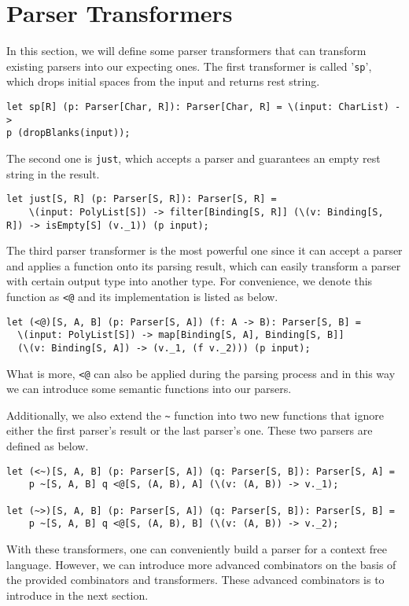 \section{Parser Transformers}
In this section, we will define some parser transformers that can transform existing parsers into our expecting ones. The first transformer is called '\texttt{sp}', which drops initial spaces from the input and returns rest string.
\begin{lstlisting}
let sp[R] (p: Parser[Char, R]): Parser[Char, R] = \(input: CharList) -> 
p (dropBlanks(input));
\end{lstlisting}
The second one is \texttt{just}, which accepts a parser and guarantees an empty rest string in the result.
\begin{lstlisting}
let just[S, R] (p: Parser[S, R]): Parser[S, R] =
    \(input: PolyList[S]) -> filter[Binding[S, R]] (\(v: Binding[S, R]) -> isEmpty[S] (v._1)) (p input);
\end{lstlisting}
The third parser transformer is the most powerful one since it can accept a parser and applies a function onto its parsing result, which can easily transform a parser with certain output type into another type. For convenience, we denote this function as \texttt{<@} and its implementation is listed as below.
\begin{lstlisting}
let (<@)[S, A, B] (p: Parser[S, A]) (f: A -> B): Parser[S, B] =
  \(input: PolyList[S]) -> map[Binding[S, A], Binding[S, B]] 
  (\(v: Binding[S, A]) -> (v._1, (f v._2))) (p input);
\end{lstlisting}
What is more, \texttt{<@} can also be applied during the parsing process and in this way we can introduce some semantic functions into our parsers.

Additionally, we also extend the \texttt{\textasciitilde} function into two new functions that ignore either the first parser's result or the last parser's one. These two parsers are defined as below.
\begin{lstlisting}
let (<~)[S, A, B] (p: Parser[S, A]) (q: Parser[S, B]): Parser[S, A] =
	p ~[S, A, B] q <@[S, (A, B), A] (\(v: (A, B)) -> v._1);
	
let (~>)[S, A, B] (p: Parser[S, A]) (q: Parser[S, B]): Parser[S, B] =
	p ~[S, A, B] q <@[S, (A, B), B] (\(v: (A, B)) -> v._2);
\end{lstlisting}
With these transformers, one can conveniently build a parser for a context free language. However, we can introduce more advanced combinators on the basis of the provided combinators and transformers. These advanced combinators is to introduce in the next section.

